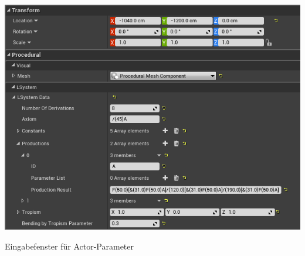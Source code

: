 \begin{center}
	\includegraphics[height=0.9\textheight]{images/CH1_EditorExample2.png}
	
	Eingabefenster für Actor-Parameter
\end{center}


\iffalse
\newpage
{}
